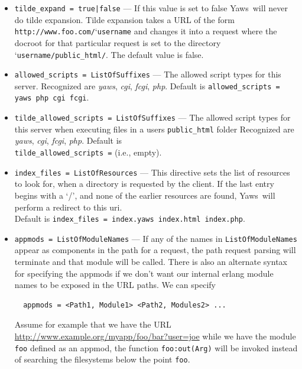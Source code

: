 \documentclass[11pt,oneside,english]{book}
\newcommand{\Yaws}            %
        {{\sc Yaws}}
\begin{document}
\begin{itemize}
\item       \verb+tilde_expand = true|false+ ---
              If  this  value  is  set  to false \Yaws\  will
              never do tilde  expansion.  Tilde expansion takes a URL
              of the form
              \verb+http://www.foo.com/+\char`\~\verb+username+ and
              changes it into a request where the docroot for that
              particular request is set to the directory
              \char`\~\verb+username/public_html/+. The default value
              is false.

\item       \verb+allowed_scripts = ListOfSuffixes+ ---
              The allowed script types for this server.  Recognized are
              \textit{yaws}, \textit{cgi}, \textit{fcgi}, \textit{php}.  Default
              is \verb+allowed_scripts = yaws php cgi fcgi+.

\item       \verb+tilde_allowed_scripts = ListOfSuffixes+ ---
             The allowed script types for this server when executing files in a
             users \verb+public_html+ folder Recognized are \textit{yaws},
             \textit{cgi}, \textit{fcgi}, \textit{php}. Default is\\
             \verb+tilde_allowed_scripts =+ (i.e., empty).

\item       \verb+index_files = ListOfResources+ ---
             This directive sets the list of resources to look for, when a
             directory is requested by the client. If the last entry begins with
             a `/', and none of the earlier resources are found, \Yaws\ will
             perform a redirect to this uri.\\
             Default is \verb+index_files = index.yaws index.html index.php+.

\item       \verb+appmods = ListOfModuleNames+ ---
             If any of the names in \verb+ListOfModuleNames+ appear as components
             in the path for a request, the path request parsing will terminate
             and that module will be called. There is also an alternate syntax
             for specifying the appmods if we don't want our internal erlang
             module names to be exposed in the URL paths.  We can specify
\begin{verbatim}
  appmods = <Path1, Module1> <Path2, Modules2> ...
\end{verbatim}
             Assume for example that we have the URL
             \url{http://www.example.org/myapp/foo/bar?user=joe} while we
             have the module \verb+foo+ defined as an appmod, the function
             \verb+foo:out(Arg)+ will be invoked instead of searching the
             filesystems below the point \verb+foo+.


\end{itemize}
\end{document}
